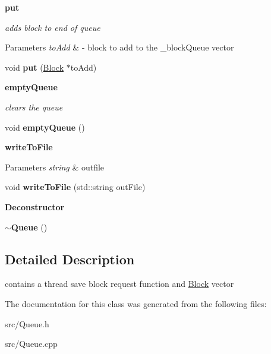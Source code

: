 \begin{Indent}{\bf put}\par
{\em adds block to end of queue


\begin{DoxyParams}{Parameters}
{\em to\+Add} & -\/ block to add to the \+\_\+block\+Queue vector \\
\hline
\end{DoxyParams}
}\begin{DoxyCompactItemize}
\item 
\hypertarget{class_queue_a33dbefb5e66c6702fb2c43356ee0c0ca}{}void {\bfseries put} (\hyperlink{class_block}{Block} $\ast$to\+Add)\label{class_queue_a33dbefb5e66c6702fb2c43356ee0c0ca}

\end{DoxyCompactItemize}
\end{Indent}
\begin{Indent}{\bf empty\+Queue}\par
{\em clears the queue }\begin{DoxyCompactItemize}
\item 
\hypertarget{class_queue_abcaf6e9785189306476e5981177bed4d}{}void {\bfseries empty\+Queue} ()\label{class_queue_abcaf6e9785189306476e5981177bed4d}

\end{DoxyCompactItemize}
\end{Indent}
\begin{Indent}{\bf write\+To\+File}\par
{\em 
\begin{DoxyParams}{Parameters}
{\em string} & outfile \\
\hline
\end{DoxyParams}
}\begin{DoxyCompactItemize}
\item 
\hypertarget{class_queue_a7aadc3ce796b95ba60b47361d9f97c85}{}void {\bfseries write\+To\+File} (std\+::string out\+File)\label{class_queue_a7aadc3ce796b95ba60b47361d9f97c85}

\end{DoxyCompactItemize}
\end{Indent}
\begin{Indent}{\bf Deconstructor}\par
\begin{DoxyCompactItemize}
\item 
\hypertarget{class_queue_a00d119db8fa3050da37746e82cbcf94f}{}{\bfseries $\sim$\+Queue} ()\label{class_queue_a00d119db8fa3050da37746e82cbcf94f}

\end{DoxyCompactItemize}
\end{Indent}


\subsection{Detailed Description}
contains a thread save block request function and \hyperlink{class_block}{Block} vector 

The documentation for this class was generated from the following files\+:\begin{DoxyCompactItemize}
\item 
src/Queue.\+h\item 
src/Queue.\+cpp\end{DoxyCompactItemize}

